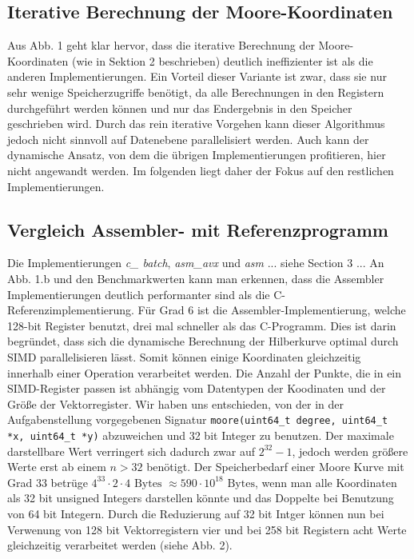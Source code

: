 \documentclass[course=erap]{aspdoc}
\begin{document}
 \subsection{Iterative Berechnung der Moore-Koordinaten}
Aus Abb. 1 geht klar hervor, dass die iterative Berechnung der Moore-Koordinaten (wie in Sektion 2 beschrieben) deutlich ineffizienter ist als die anderen Implementierungen. Ein Vorteil dieser Variante ist zwar, dass sie nur sehr wenige Speicherzugriffe benötigt, da alle Berechnungen in den Registern durchgeführt werden können und nur das Endergebnis in den Speicher geschrieben wird. Durch das rein iterative Vorgehen kann dieser Algorithmus jedoch nicht sinnvoll auf Datenebene parallelisiert werden. Auch kann der dynamische Ansatz, von dem die übrigen Implementierungen profitieren, hier nicht angewandt werden. Im folgenden liegt daher der Fokus auf den restlichen Implementierungen.

\subsection{Vergleich Assembler- mit Referenzprogramm}
Die Implementierungen \textit{c\_ batch}, \textit{asm\_avx} und \textit{asm} ... siehe Section 3 ... \newline
An Abb. 1.b und den Benchmarkwerten kann man erkennen, dass die Assembler Implementierungen deutlich performanter sind als die C-Referenzimplementierung. Für Grad 6 ist die Assembler-Implementierung, welche 128-bit Register benutzt, drei mal schneller als das C-Programm. Dies ist darin begründet, dass sich die dynamische Berechnung der Hilberkurve optimal durch SIMD parallelisieren lässt. Somit können einige Koordinaten gleichzeitig innerhalb einer Operation verarbeitet werden. Die Anzahl der Punkte, die in ein SIMD-Register passen ist abhängig vom Datentypen der Koodinaten und der Größe der Vektorregister. Wir haben uns entschieden, von der in der Aufgabenstellung vorgegebenen Signatur \texttt{moore(uint64\_t degree, uint64\_t *x, uint64\_t *y)} abzuweichen und 32 bit Integer zu benutzen. Der maximale darstellbare Wert verringert sich dadurch zwar auf $2^{32}-1$, jedoch werden größere Werte erst ab einem $n > 32$ benötigt. Der Speicherbedarf einer Moore Kurve mit Grad 33 betrüge $4^{33} \cdot 2 \cdot 4 \text{ Bytes } \approx 590 \cdot 10^{18} \text{ Bytes}$, wenn man alle Koordinaten als 32 bit unsigned Integers darstellen könnte und das Doppelte bei Benutzung von 64 bit Integern. 
\newline
Durch die Reduzierung auf 32 bit Intger können nun bei Verwenung von 128 bit Vektorregistern vier und bei 258 bit Registern acht Werte gleichzeitig verarbeitet werden (siehe Abb. 2).
\end{document}
